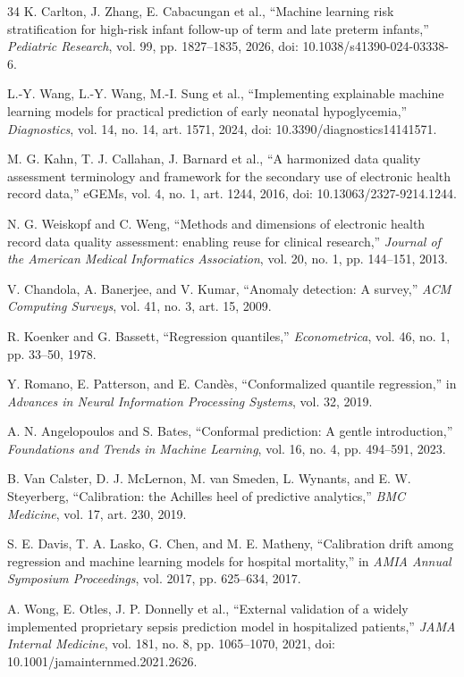 \begin{thebibliography}{34}
K. Carlton, J. Zhang, E. Cabacungan et al., ``Machine learning risk stratification for high-risk infant follow-up of term and late preterm infants,'' \emph{Pediatric Research}, vol. 99, pp. 1827--1835, 2026, doi: 10.1038/s41390-024-03338-6.

L.-Y. Wang, L.-Y. Wang, M.-I. Sung et al., ``Implementing explainable machine learning models for practical prediction of early neonatal hypoglycemia,'' \emph{Diagnostics}, vol. 14, no. 14, art. 1571, 2024, doi: 10.3390/diagnostics14141571.

M. G. Kahn, T. J. Callahan, J. Barnard et al., ``A harmonized data quality assessment terminology and framework for the secondary use of electronic health record data,'' eGEMs, vol. 4, no. 1, art. 1244, 2016, doi: 10.13063/2327-9214.1244.

N. G. Weiskopf and C. Weng, ``Methods and dimensions of electronic health record data quality assessment: enabling reuse for clinical research,'' \emph{Journal of the American Medical Informatics Association}, vol. 20, no. 1, pp. 144--151, 2013.

V. Chandola, A. Banerjee, and V. Kumar, ``Anomaly detection: A survey,'' \emph{ACM Computing Surveys}, vol. 41, no. 3, art. 15, 2009.

R. Koenker and G. Bassett, ``Regression quantiles,'' \emph{Econometrica}, vol. 46, no. 1, pp. 33--50, 1978.

Y. Romano, E. Patterson, and E. Candès, ``Conformalized quantile regression,'' in \emph{Advances in Neural Information Processing Systems}, vol. 32, 2019.

A. N. Angelopoulos and S. Bates, ``Conformal prediction: A gentle introduction,'' \emph{Foundations and Trends in Machine Learning}, vol. 16, no. 4, pp. 494--591, 2023.

B. Van Calster, D. J. McLernon, M. van Smeden, L. Wynants, and E. W. Steyerberg, ``Calibration: the Achilles heel of predictive analytics,'' \emph{BMC Medicine}, vol. 17, art. 230, 2019.

S. E. Davis, T. A. Lasko, G. Chen, and M. E. Matheny, ``Calibration drift among regression and machine learning models for hospital mortality,'' in \emph{AMIA Annual Symposium Proceedings}, vol. 2017, pp. 625--634, 2017.

A. Wong, E. Otles, J. P. Donnelly et al., ``External validation of a widely implemented proprietary sepsis prediction model in hospitalized patients,'' \emph{JAMA Internal Medicine}, vol. 181, no. 8, pp. 1065--1070, 2021, doi: 10.1001/jamainternmed.2021.2626.


\end{thebibliography}
